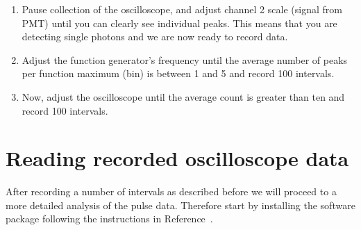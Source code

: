 \documentclass[10pt,aps,twocolumn,secnumarabic,balancelastpage,amsmath,amssymb,nofootinbib,floatfix]{revtex4}
\begin{document}
\begin{enumerate}

\item Pause collection of the oscilloscope, and adjust channel 2 scale (signal from PMT) until you can clearly see individual peaks. This means that you are detecting single photons and we are now ready to record data.

\item Adjust the function generator's frequency until the average number of peaks per function maximum (bin) is between 1 and 5 and record 100 intervals.



\item Now, adjust the oscilloscope until the average count is greater than ten and record 100 intervals.


\end{enumerate}

\section{Reading recorded oscilloscope data}

After recording a number of intervals as described before we will proceed to a more detailed analysis of the pulse data. Therefore start by installing the software package following the instructions in Reference~\cite{cite:pulses}.
\end{document}
